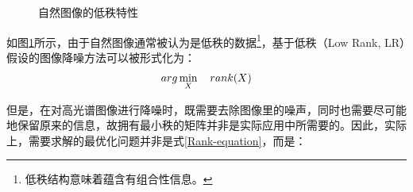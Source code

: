 \documentclass[12pt, a4paper]{article}
\begin{document}
\begin{figure}[H]
\centering
{}

\caption{自然图像的低秩特性}
\label{svd-example}
\end{figure}
\par 如图\ref{svd-example}所示，由于自然图像通常被认为是低秩的数据\footnote{低秩结构意味着蕴含有组合性信息。}\cite{TNN-1}，基于低秩（Low Rank, LR）假设的图像降噪方法可以被形式化为：
\begin{equation}
\centering
arg\min\limits_{X} \quad rank(X)
\label{Rank-equation}
\end{equation}
\par 但是，在对高光谱图像进行降噪时，既需要去除图像里的噪声，同时也需要尽可能地保留原来的信息\cite{log-norm}，故拥有最小秩的矩阵并非是实际应用中所需要的\cite{log-norm}。因此，实际上，需要求解的最优化问题并非是式\ref{Rank-equation}，而是：
\end{document}
